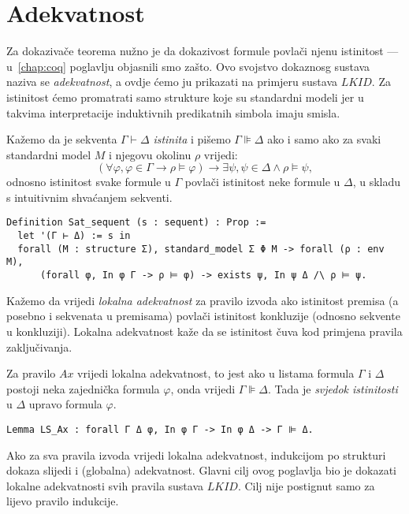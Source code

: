 \section{Adekvatnost}\label{sec:adekvatnost}
Za dokazivače teorema nužno je da dokazivost formule povlači njenu istinitost ---
u~\ref{chap:coq} poglavlju objasnili smo zašto.
Ovo svojstvo dokaznosg sustava naziva se \textit{adekvatnost},
a ovdje ćemo ju prikazati na primjeru sustava \(\mathit{LKID}\).
Za istinitost ćemo promatrati samo strukture koje su standardni modeli
jer u takvima interpretacije induktivnih predikatnih simbola imaju smisla.

\begin{definition}
  Kažemo da je sekventa \(\Gamma \vdash \Delta\) \textit{istinita} i pišemo \(\Gamma \VDash \Delta\) ako i samo ako
  za svaki standardni model \(M\) i njegovu okolinu \(\rho\) vrijedi:
  \[
    (\forall \varphi, \varphi \in \Gamma \rightarrow \rho \vDash \varphi) \rightarrow \exists \psi, \psi \in \Delta \land \rho \vDash \psi,
  \]
  \noindent odnosno istinitost svake formule u \(\Gamma\) povlači istinitost neke formule u \(\Delta\),
  u skladu s intuitivnim shvaćanjem sekventi.
\begin{verbatim}
Definition Sat_sequent (s : sequent) : Prop :=
  let '(Γ ⊢ Δ) := s in            
  forall (M : structure Σ), standard_model Σ Φ M -> forall (ρ : env M),
      (forall φ, In φ Γ -> ρ ⊨ φ) -> exists ψ, In ψ Δ /\ ρ ⊨ ψ.
\end{verbatim}
\end{definition}

Kažemo da vrijedi \textit{lokalna adekvatnost} za pravilo izvoda
ako istinitost premisa (a posebno i sekvenata u premisama) povlači istinitost konkluzije (odnosno sekvente u konkluziji).
Lokalna adekvatnost kaže da se istinitost čuva kod primjena pravila zaključivanja.

\begin{example}
  Za pravilo \(\mathit{Ax}\) vrijedi lokalna adekvatnost,
  to jest ako u listama formula \(\Gamma\) i \(\Delta\) postoji neka zajednička formula \(\varphi\),
  onda vrijedi \(\Gamma \VDash \Delta\). Tada je \textit{svjedok istinitosti} u \(\Delta\) upravo formula \(\varphi\).
\begin{verbatim}
Lemma LS_Ax : forall Γ Δ φ, In φ Γ -> In φ Δ -> Γ ⊫ Δ.
\end{verbatim}
\end{example}

Ako za sva pravila izvoda vrijedi lokalna adekvatnost,
indukcijom po strukturi dokaza slijedi i (globalna) adekvatnost.
Glavni cilj ovog poglavlja bio je dokazati lokalne adekvatnosti svih pravila sustava \(\mathit{LKID}\).
Cilj nije postignut samo za lijevo pravilo indukcije.

